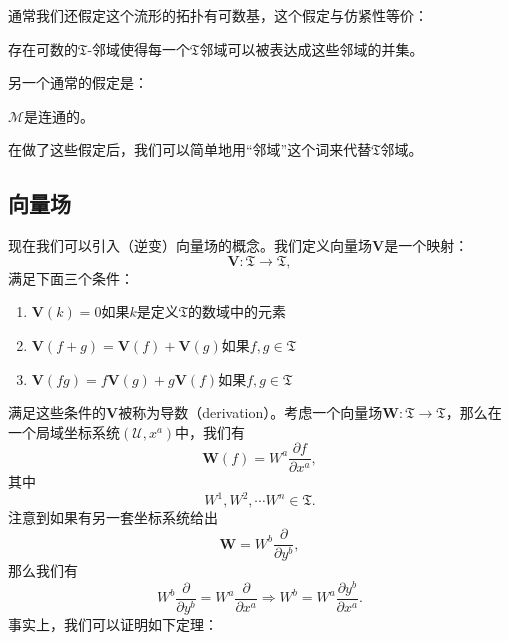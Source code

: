 通常我们还假定这个流形的拓扑有可数基，这个假定与仿紧性等价：

\begin{post}[label={postulate 5.4}]{}
	存在可数的$\mathfrak{T}$-邻域使得每一个$\mathfrak{T}$邻域可以被表达成这些邻域的并集。
\end{post}

另一个通常的假定是：
\begin{post}[label={postulate 5.5}]{}
	$\mathcal{M}$是连通的。
\end{post}

在做了这些假定后，我们可以简单地用“邻域”这个词来代替$\mathfrak{T}$邻域。


\subsection{向量场}

现在我们可以引入（逆变）向量场的概念。我们定义向量场$\boldsymbol{V}$是一个映射：
\begin{equation*}
	\boldsymbol{V} :\mathfrak{T}\rightarrow \mathfrak{T} ,
\end{equation*}
满足下面三个条件：
\begin{enumerate}[label=(\alph*)]
	\item $\boldsymbol{V}( k) =0$如果$k$是定义$\mathfrak{T}$的数域中的元素
	\item $\boldsymbol{V}( f+g) =\boldsymbol{V}( f) +\boldsymbol{V}( g)$如果$f,g\in \mathfrak{T}$
	\item $\boldsymbol{V}( fg) =f\boldsymbol{V}( g) +g\boldsymbol{V}( f)$如果$f,g\in \mathfrak{T}$
\end{enumerate}

满足这些条件的$\boldsymbol{V}$被称为导数（derivation）。考虑一个向量场$\boldsymbol{W} :\mathfrak{T}\rightarrow \mathfrak{T}$，那么在一个局域坐标系统$(\mathcal{U} ,x^{a} )$中，我们有
\begin{equation*}
	\boldsymbol{W}( f) =W^{a}\frac{\partial f}{\partial x^{a}} ,
\end{equation*}
其中
\begin{equation*}
	W^{1} ,W^{2} ,\cdots W^{n} \in \mathfrak{T} .
\end{equation*}
注意到如果有另一套坐标系统给出
\begin{equation*}
	\boldsymbol{W} =W^{b}\frac{\partial }{\partial y^{b}} ,
\end{equation*}
那么我们有
\begin{equation*}
	W^{b}\frac{\partial }{\partial y^{b}} =W^{a}\frac{\partial }{\partial x^{a}} \Rightarrow W^{b} =W^{a}\frac{\partial y^{b}}{\partial x^{a}} .
\end{equation*}
事实上，我们可以证明如下定理：

